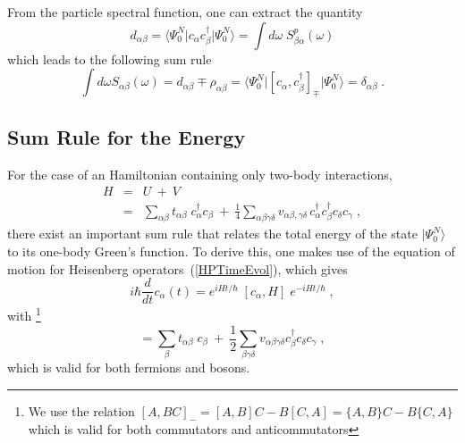 From the particle spectral function, one can extract the quantity
\begin{equation}
 d_{\alpha \beta} = \langle \Psi^N_0 \vert c_\alpha c^\dag_\beta \vert \Psi^N_0 \rangle
 = \int d\omega \; S^p_{\beta \alpha}(\omega)
\end{equation}
which leads to the following sum rule
\begin{equation}
 \int d\omega S_{\alpha \beta} (\omega) = d_{\alpha \beta} \mp \rho _{\alpha \beta} = 
 \langle \Psi^N_0 \vert [c_\alpha,   c_\beta^\dag]_\mp \vert \Psi^N_0 \rangle   = \delta_{\alpha \beta} \; .
\end{equation}


\subsection{Sum Rule for the Energy}


For the case of an Hamiltonian containing only two-body interactions,
\begin{eqnarray}
 H &=& U ~+~ V
\nonumber \\
 &=& \sum_{\alpha \beta} t_{\alpha \beta} \; c_\alpha^\dag c_\beta
   ~+~  \frac{1}{4} \sum_{\alpha \beta \gamma \delta}  v_{\alpha \beta, \gamma \delta} \, c^\dag_\alpha c^\dag_\beta  c_\delta c_\gamma \; ,
\end{eqnarray}
there exist an important sum rule that relates the total energy of the state $\vert \Psi^N_0 \rangle$ to its one-body Green's function.
%
To derive this, one makes use of the equation of motion for Heisenberg operators~(\ref{HPTimeEvol}), which gives
\begin{equation}
 i \hbar \frac{d}{d t} c_\alpha(t) = e^{iHt/\hbar}  \; [ c_\alpha , H ]  \; e^{-iHt/\hbar} \; ,
\end{equation}
with%
\footnote{We use the relation $[A,BC]_- = [A,B] C - B [C,A] = \{A,B\} C - B \{C,A\}$ which is valid for both commutators and anticommutators}
\begin{equation}
 [ c_\alpha , H ] = \sum_\beta t_{\alpha \beta} \; c_\beta 
~+~ \frac{1}{2} \sum_{\beta \gamma \delta}  v_{\alpha \beta \gamma \delta} c^\dag_\beta  c_\delta c_\gamma \; ,
\label{aH_commutator}
\end{equation}
which is valid for both fermions and bosons.

